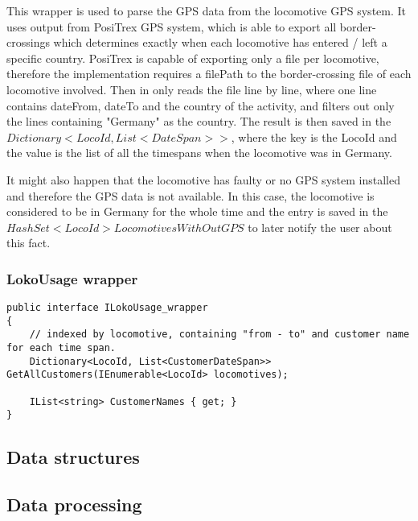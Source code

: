 \documentclass[11pt]{article}
\begin{document}
This wrapper is used to parse the GPS data from the locomotive GPS system. It uses output from PosiTrex GPS system, which is able to export all border-crossings which determines exactly when each locomotive has entered / left a specific country. PosiTrex is capable of exporting only a file per locomotive, therefore the implementation requires a filePath to the border-crossing file of each locomotive involved. Then in only reads the file line by line, where one line contains dateFrom, dateTo and the country of the activity, and filters out only the lines containing "Germany" as the country. The result is then saved in the \begin{math}Dictionary<LocoId, List<DateSpan>>\end{math}, where the key is the LocoId and the value is the list of all the timespans when the locomotive was in Germany.

It might also happen that the locomotive has faulty or no GPS system installed and therefore the GPS data is not available. In this case, the locomotive is considered to be in Germany for the whole time and the entry is saved in the \begin{math}HashSet<LocoId>LocomotivesWithOutGPS\end{math} to later notify the user about this fact.

\subsubsection{LokoUsage wrapper}
\label{sec:LokoUsageWrapper}

\begin{verbatim}
public interface ILokoUsage_wrapper
{
    // indexed by locomotive, containing "from - to" and customer name for each time span.
    Dictionary<LocoId, List<CustomerDateSpan>> GetAllCustomers(IEnumerable<LocoId> locomotives);

    IList<string> CustomerNames { get; }
}
\end{verbatim}

\subsection{Data structures}
\label{sec:DataStructures}

\subsection{Data processing}
\label{sec:DataProcessing}
\end{document}
